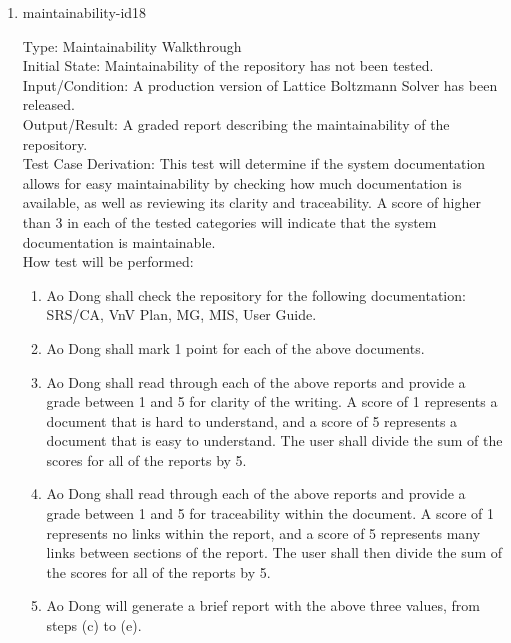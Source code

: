 \documentclass[12pt, titlepage]{article}
\newcommand{\myprogname}{Lattice Boltzmann Solver}
\begin{document}
\begin{enumerate}

\item{maintainability-id18\\}

Type: Maintainability Walkthrough\\
					
Initial State: Maintainability of the repository has not been tested.\\
					
Input/Condition: A production version of {\myprogname} has been released.\\
					
Output/Result: A graded report describing the maintainability of the repository.\\

Test Case Derivation: This test will determine if the system documentation allows for easy maintainability by checking how much documentation is available, as well as reviewing its clarity and traceability. A score of higher than 3 in each of the tested categories will indicate that the system documentation is maintainable.\\ 
					
How test will be performed: 

\begin{enumerate}
\item Ao Dong shall check the repository for the following documentation: SRS/CA, VnV Plan, MG, MIS, User Guide.
\item Ao Dong shall mark 1 point for each of the above documents.
\item Ao Dong shall read through each of the above reports and provide a grade between 1 and 5 for clarity of the writing. A score of 1 represents a document that is hard to understand, and a score of 5 represents a document that is easy to understand. The user shall divide the sum of the scores for all of the reports by 5.
\item Ao Dong shall read through each of the above reports and provide a grade between 1 and 5 for traceability within the document. A score of 1 represents no links within the report, and a score of 5 represents many links between sections of the report. The user shall then divide the sum of the scores for all of the reports by 5.
\item Ao Dong will generate a brief report with the above three values, from steps (c) to (e).\\
\end{enumerate}

\end{enumerate}
\end{document}
